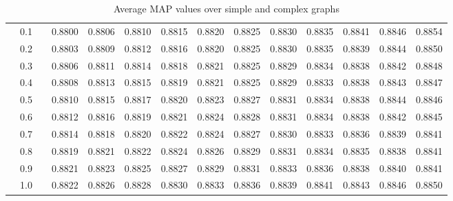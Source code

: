 \begin{table}
{\begin{tabular}{llc@{\hs}rrrrrrrrrrr}
			\phantom{a} & 0.1 & \phantom{a} & 0.8800 & 0.8806 & 0.8810 & 0.8815 & 0.8820 & 0.8825 & 0.8830 & 0.8835 & 0.8841 & 0.8846 & 0.8854 \\
			\phantom{a} & 0.2 & \phantom{a} & 0.8803 & 0.8809 & 0.8812 & 0.8816 & 0.8820 & 0.8825 & 0.8830 & 0.8835 & 0.8839 & 0.8844 & 0.8850 \\
			\phantom{a} & 0.3 & \phantom{a} & 0.8806 & 0.8811 & 0.8814 & 0.8818 & 0.8821 & 0.8825 & 0.8829 & 0.8834 & 0.8838 & 0.8842 & 0.8848 \\
			\phantom{a} & 0.4 & \phantom{a} & 0.8808 & 0.8813 & 0.8815 & 0.8819 & 0.8821 & 0.8825 & 0.8829 & 0.8833 & 0.8838 & 0.8843 & 0.8847 \\
			\phantom{a} & 0.5 & \phantom{a} & 0.8810 & 0.8815 & 0.8817 & 0.8820 & 0.8823 & 0.8827 & 0.8831 & 0.8834 & 0.8838 & 0.8844 & 0.8846 \\
			\phantom{a} & 0.6 & \phantom{a} & 0.8812 & 0.8816 & 0.8819 & 0.8821 & 0.8824 & 0.8828 & 0.8831 & 0.8834 & 0.8838 & 0.8842 & 0.8845 \\
			\phantom{a} & 0.7 & \phantom{a} & 0.8814 & 0.8818 & 0.8820 & 0.8822 & 0.8824 & 0.8827 & 0.8830 & 0.8833 & 0.8836 & 0.8839 & 0.8841 \\
			\phantom{a} & 0.8 & \phantom{a} & 0.8819 & 0.8821 & 0.8822 & 0.8824 & 0.8826 & 0.8829 & 0.8831 & 0.8834 & 0.8835 & 0.8838 & 0.8841 \\
			\phantom{a} & 0.9 & \phantom{a} & 0.8821 & 0.8823 & 0.8825 & 0.8827 & 0.8829 & 0.8831 & 0.8833 & 0.8836 & 0.8838 & 0.8840 & 0.8841 \\
			\phantom{a} & 1.0 & \phantom{a} & 0.8822 & 0.8826 & 0.8828 & 0.8830 & 0.8833 & 0.8836 & 0.8839 & 0.8841 & 0.8843 & 0.8846 & 0.8850 \\
			\bottomrule
		\end{tabular}
	}
	\caption{Average MAP values over simple and complex graphs}
	\label{tab:summary-ranking-norm}
\end{table}
